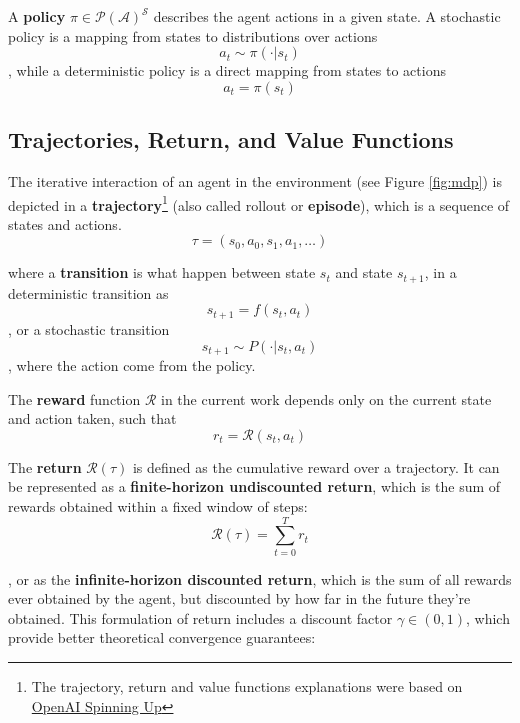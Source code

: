 

A \textbf{policy} $\pi \in \mathcal{P}(\mathcal{A})^\mathcal{S}$ describes the agent actions in a given state. A stochastic policy is a mapping from states to distributions over actions
\begin{equation}
    a_t \sim \pi(\cdot|s_t)
\end{equation}
, while a deterministic policy is a direct mapping from states to actions
\begin{equation}
a_t = \pi(s_t)    
\end{equation} 

\subsection{Trajectories, Return, and Value Functions}

The iterative interaction of an agent in the environment (see Figure \ref{fig:mdp}) is depicted in a \textbf{trajectory}\footnote{The trajectory, return and value functions explanations were based on \href{https://spinningup.openai.com/en/latest/spinningup/rl_intro.html}{OpenAI Spinning Up}} (also called rollout or \textbf{episode}), which is a sequence of states and actions.
$$\tau = (s_0, a_0, s_1, a_1, \dots )$$

where a \textbf{transition} is what happen between state $s_t$ and state $s_{t+1}$, in a deterministic transition as 
$$s_{t+1} = f(s_t, a_t)$$, 
or a stochastic transition $$s_{t+1} \sim P(\cdot | s_t, a_t)$$, where the action come from the policy.

The \textbf{reward} function $\mathcal{R}$ in the current work depends only on the current state and action taken, such that
$$r_t = \mathcal{R}(s_t,a_t)$$

The \textbf{return} $\mathcal{R}(\tau)$ is defined as the cumulative reward over a trajectory. It can be represented as a \textbf{finite-horizon undiscounted return}, which is the sum of rewards obtained within a fixed window of steps:
$$\mathcal{R}(\tau) = \sum_{t=0}^T r_t$$

, or as the \textbf{infinite-horizon discounted return}, which is the sum of all rewards ever obtained by the agent, but discounted by how far in the future they’re obtained. This formulation of return includes a discount factor $\gamma \in (0,1)$, which provide better theoretical convergence guarantees:

